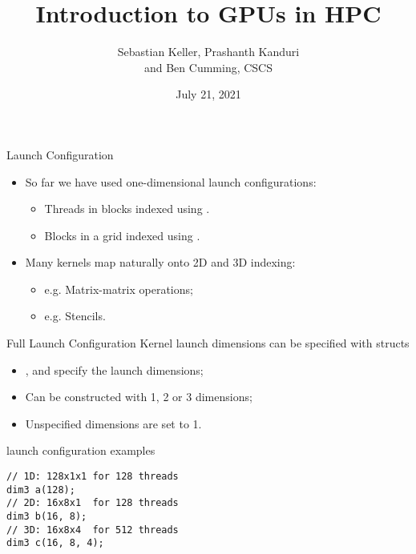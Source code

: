 \documentclass[aspectratio=43]{beamer}
\author{Sebastian Keller, Prashanth Kanduri\\ and Ben Cumming, CSCS}
\title{Introduction to GPUs in HPC}
\subtitle{}
\date{July 21, 2021}
\begin{document}
\cscstitle


\begin{frame}[fragile]{Launch Configuration}
       \begin{itemize}
           \item So far we have used one-dimensional launch configurations:
           \begin{itemize}
               \item Threads in blocks indexed using .
               \item Blocks in a grid indexed using .
           \end{itemize}
           \item Many kernels map naturally onto 2D and 3D indexing:
           \begin{itemize}
               \item e.g. Matrix-matrix operations;
               \item e.g. Stencils.
           \end{itemize}
       \end{itemize}

\end{frame}

\begin{frame}[fragile]{Full Launch Configuration}
        Kernel launch dimensions can be specified with  structs
        \begin{center}
        \end{center}
       \begin{itemize}
           \item {},  and  specify the launch dimensions;
           \item Can be constructed with 1, 2 or 3 dimensions;
           \item Unspecified  dimensions are set to 1.
       \end{itemize}

   \begin{code}{launch configuration examples}
        \begin{lstlisting}[style=boxcudatiny]
// 1D: 128x1x1 for 128 threads
dim3 a(128);
// 2D: 16x8x1  for 128 threads
dim3 b(16, 8);
// 3D: 16x8x4  for 512 threads
dim3 c(16, 8, 4);
        \end{lstlisting}
   \end{code}

\end{frame}
\end{document}
